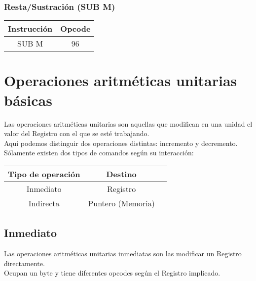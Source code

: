 \documentclass[12pt]{article}
\begin{document}
			\subsubsection{Resta/Sustración (SUB M)}
			
				\begin{table}[H]
					\centering
					\begin{tabular}{c|c}
						Instrucción & Opcode \\
						\midrule
						SUB M & 96 \\
					\end{tabular}
				\end{table}
				
	\section{Operaciones aritméticas unitarias básicas}

		Las operaciones aritméticas unitarias son aquellas que modifican en una unidad el valor del Registro con el que se esté trabajando.\\
		
		Aquí podemos distinguir dos operaciones distintas: incremento y decremento.\\
	
		Sólamente existen dos tipos de comandos según su interacción:
	
		\begin{table}[H]
			\centering
			\begin{tabular}{c|cc}
				\toprule
				Tipo de operación & Destino \\
				\midrule
				Inmediato & Registro \\
				Indirecta & Puntero (Memoria) \\			
				\bottomrule
			\end{tabular}
	
		\end{table}
	
		\subsection{Inmediato}
		
			Las operaciones aritméticas unitarias inmediatas son las modificar un Registro directamente.\\
			
			Ocupan un byte y tiene diferentes opcodes según el Registro implicado.\\
	
\end{document}
